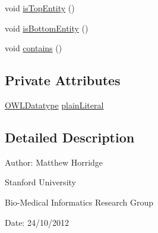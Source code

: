 \begin{DoxyCompactItemize}
\item 
void \hyperlink{classorg_1_1semanticweb_1_1owlapi_1_1api_1_1test_1_1literals_1_1_o_w_l2_datatype_impl_test_case_a7a702ea11d78a8e678ec73e55ea03e24}{is\-Top\-Entity} ()
\item 
void \hyperlink{classorg_1_1semanticweb_1_1owlapi_1_1api_1_1test_1_1literals_1_1_o_w_l2_datatype_impl_test_case_a86199fb9c05a0e083d1667c8286a3383}{is\-Bottom\-Entity} ()
\item 
void \hyperlink{classorg_1_1semanticweb_1_1owlapi_1_1api_1_1test_1_1literals_1_1_o_w_l2_datatype_impl_test_case_a3e0db21dd64c7083238a39953caf1690}{contains} ()
\end{DoxyCompactItemize}
\subsection*{Private Attributes}
\begin{DoxyCompactItemize}
\item 
\hyperlink{interfaceorg_1_1semanticweb_1_1owlapi_1_1model_1_1_o_w_l_datatype}{O\-W\-L\-Datatype} \hyperlink{classorg_1_1semanticweb_1_1owlapi_1_1api_1_1test_1_1literals_1_1_o_w_l2_datatype_impl_test_case_abc9333e1d909a00e8b8dd3faf4e1b3e5}{plain\-Literal}
\end{DoxyCompactItemize}


\subsection{Detailed Description}
Author\-: Matthew Horridge\par
 Stanford University\par
 Bio-\/\-Medical Informatics Research Group\par
 Date\-: 24/10/2012 

